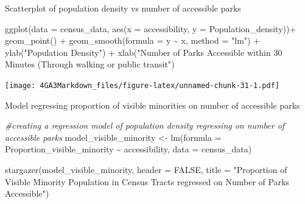 \documentclass[
]{article}
\newenvironment{Shaded}{\begin{snugshade}}{\end{snugshade}}
\newcommand{\AttributeTok}[1]{\textcolor[rgb]{0.77,0.63,0.00}{#1}}
\newcommand{\CommentTok}[1]{\textcolor[rgb]{0.56,0.35,0.01}{\textit{#1}}}
\newcommand{\ConstantTok}[1]{\textcolor[rgb]{0.00,0.00,0.00}{#1}}
\newcommand{\FunctionTok}[1]{\textcolor[rgb]{0.00,0.00,0.00}{#1}}
\newcommand{\NormalTok}[1]{#1}
\newcommand{\OtherTok}[1]{\textcolor[rgb]{0.56,0.35,0.01}{#1}}
\newcommand{\SpecialCharTok}[1]{\textcolor[rgb]{0.00,0.00,0.00}{#1}}
\newcommand{\StringTok}[1]{\textcolor[rgb]{0.31,0.60,0.02}{#1}}
\begin{document}
Scatterplot of population density vs number of accessible parks

\begin{Shaded}
\begin{Highlighting}[]
\FunctionTok{ggplot}\NormalTok{(}\AttributeTok{data =}\NormalTok{ census\_data, }
       \FunctionTok{aes}\NormalTok{(}\AttributeTok{x =}\NormalTok{ accessibility, }
           \AttributeTok{y =}\NormalTok{ Population\_density))}\SpecialCharTok{+}
  \FunctionTok{geom\_point}\NormalTok{() }\SpecialCharTok{+}
  \FunctionTok{geom\_smooth}\NormalTok{(}\AttributeTok{formula =}\NormalTok{ y }\SpecialCharTok{\textasciitilde{}}\NormalTok{ x,}
              \AttributeTok{method =} \StringTok{"lm"}\NormalTok{) }\SpecialCharTok{+}
  \FunctionTok{ylab}\NormalTok{(}\StringTok{"Population Density"}\NormalTok{) }\SpecialCharTok{+}
  \FunctionTok{xlab}\NormalTok{(}\StringTok{"Number of Parks Accessible within 30 Minutes (Through walking or public transit"}\NormalTok{) }
\end{Highlighting}
\end{Shaded}

\texttt{[image: 4GA3Markdown\_files/figure-latex/unnamed-chunk-31-1.pdf]}

Model regressing proportion of visible minorities on number of
accessible parks

\begin{Shaded}
\begin{Highlighting}[]
\CommentTok{\#creating a regression model of population density regressing on number of accessible parks}
\NormalTok{model\_visible\_minority }\OtherTok{\textless{}{-}} \FunctionTok{lm}\NormalTok{(}\AttributeTok{formula =}\NormalTok{ Proportion\_visible\_minority }\SpecialCharTok{\textasciitilde{}}\NormalTok{ accessibility, }
             \AttributeTok{data =}\NormalTok{ census\_data)}

\FunctionTok{stargazer}\NormalTok{(model\_visible\_minority,}
          \AttributeTok{header =} \ConstantTok{FALSE}\NormalTok{,}
          \AttributeTok{title =} \StringTok{"Proportion of Visible Minority Population in Census Tracts regressed on Number of Parks Accessible"}\NormalTok{)}
\end{Highlighting}
\end{Shaded}
\end{document}
